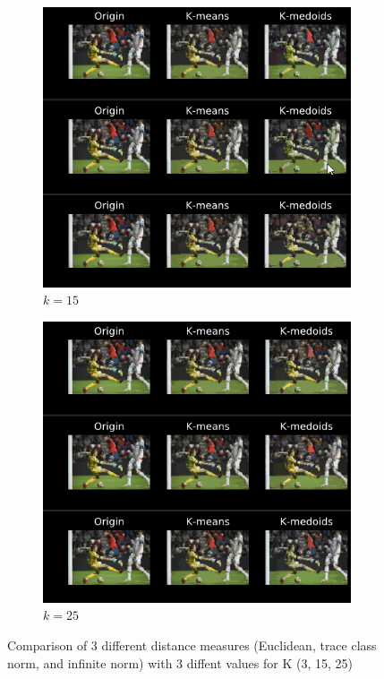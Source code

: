 \documentclass[a4paper]{article}
\begin{document}
\begin{figure}[h]
\begin{subfigure}[b]{0.3\textwidth}
        \includegraphics[width=\textwidth]{k_15.png}
        \caption{$k=15$}
        \label{fig:k_15}
    \end{subfigure}
    \begin{subfigure}[b]{0.3\textwidth}
        \includegraphics[width=\textwidth]{k_25.png}
        \caption{$k=25$}
        \label{fig:k_25}
    \end{subfigure}
    \caption{Comparison of 3 different distance measures (Euclidean, trace class norm, and infinite norm) with 3 diffent values for K (3, 15, 25)}\label{fig1}
\end{figure}
\end{document}
